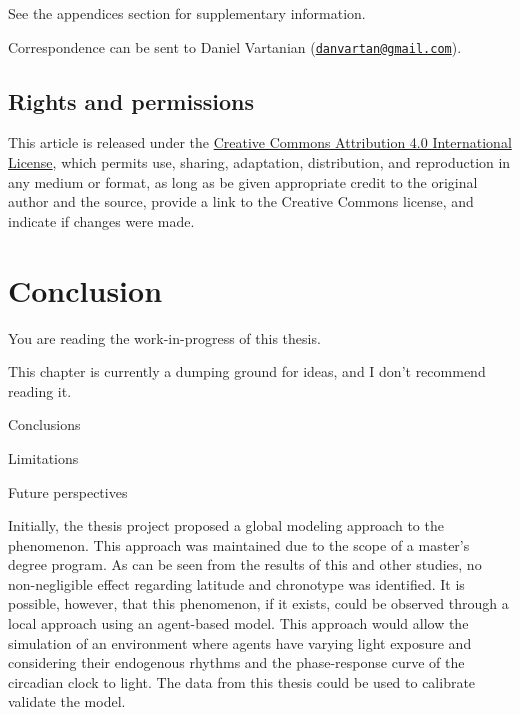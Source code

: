 \documentclass[
12pt,
openright,
oneside,
a4paper,
chapter=TITLE,
section=TITLE,
french,
spanish,
brazil,
english
]{abntex2}\usepackage{array}
\newcommand{\microskip}{\vspace{\microskipamount}}
\renewcommand{\baselinestretch}{1.5}
\renewcommand{\tocprintchapternonum}{
  \addtocontents{toc}{\setlength{\cftchapterindent}{5.65em}}
  \addtocontents{toc}{\setlength{\cftchapternumwidth}{0em}}
}
\newcommand{\tocskipone}{
  \addtocontents{toc}{\protect\vspace{\smallskipamount}}
}
\newcommand{\newbibname}{REFERENCES}
\begin{document}
See the appendices section for supplementary information.

Correspondence can be sent to Daniel Vartanian
(\href{mailto:danvartan@gmail.com}{\nolinkurl{danvartan@gmail.com}}).

\section{Rights and permissions}\label{rights-and-permissions}

This article is released under the
\href{http://creativecommons.org/licenses/by/4.0/}{Creative Commons
Attribution 4.0 International License}, which permits use, sharing,
adaptation, distribution, and reproduction in any medium or format, as
long as be given appropriate credit to the original author and the
source, provide a link to the Creative Commons license, and indicate if
changes were made.


\chapter{Conclusion}\label{conclusion}

\begin{tcolorbox}[enhanced jigsaw, opacitybacktitle=0.6, titlerule=0mm, coltitle=black, bottomtitle=1mm, breakable, rightrule=.15mm, left=2mm, title=\textcolor{quarto-callout-important-color}{\faExclamation}\hspace{0.5em}{Important}, opacityback=0, colbacktitle=quarto-callout-important-color!10!white, toprule=.15mm, toptitle=1mm, leftrule=.75mm, colback=white, bottomrule=.15mm, arc=.35mm, colframe=quarto-callout-important-color-frame]

You are reading the work-in-progress of this thesis.

\microskip

This chapter is currently a dumping ground for ideas, and I don't
recommend reading it.

\end{tcolorbox}

Conclusions

Limitations

Future perspectives

Initially, the thesis project proposed a global modeling approach to the
phenomenon. This approach was maintained due to the scope of a master's
degree program. As can be seen from the results of this and other
studies, no non-negligible effect regarding latitude and chronotype was
identified. It is possible, however, that this phenomenon, if it exists,
could be observed through a local approach using an agent-based model.
This approach would allow the simulation of an environment where agents
have varying light exposure and considering their endogenous rhythms and
the phase-response curve of the circadian clock to light. The data from
this thesis could be used to calibrate validate the model.

\postextual

\begingroup
\renewcommand{\baselinestretch}{1}
\setcounter{footnote}{0}
\renewcommand{\thefootnote}{\fnsymbol{footnote}}
\printbibliography[heading=bibheading]
\endgroup

\tocskipone
\tocprintchapternonum
\addcontentsline{toc}{chapter}{\newbibname}
\end{document}
